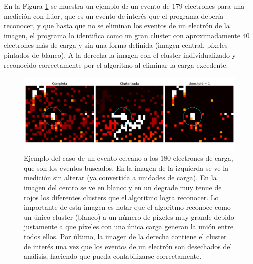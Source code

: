 En la Figura \ref{fig:ClusterPegoteado} se muestra un ejemplo de un evento de $179$ electrones para una medición con flúor, que es un evento de interés que el programa debería reconocer, y que hasta que no se eliminan los eventos de un electrón de la imagen, el programa lo identifica como un gran cluster con aproximadamente $40$ electrones más de carga y sin una forma definida (imagen central, píxeles pintados de blanco). A la derecha la imagen con el cluster individualizado y reconocido correctamente por el algoritmo al eliminar la carga excedente.
\begin{figure}[H]
    \centering
    \includegraphics[scale=0.4]{Figs/despegoteo_clusters.pdf}
    \caption{Ejemplo del caso de un evento cercano a los $180$ electrones de carga, que son los eventos buscados. En la imagen de la izquierda se ve la medición sin alterar (ya convertida a unidades de carga). En la imagen del centro se ve en blanco y en un degrade muy tenue de rojos los diferentes clusters que el algoritmo logra reconocer. Lo importante de esta imagen es notar que el algoritmo reconoce como un único cluster (blanco) a un número de píxeles muy grande debido justamente a que píxeles con una única carga generan la unión entre todos ellos. Por último, la imagen de la derecha contiene el cluster de interés una vez que los eventos de un electrón son desechados del análisis, haciendo que pueda contabilizarse correctamente.}
    \label{fig:ClusterPegoteado}
\end{figure}

